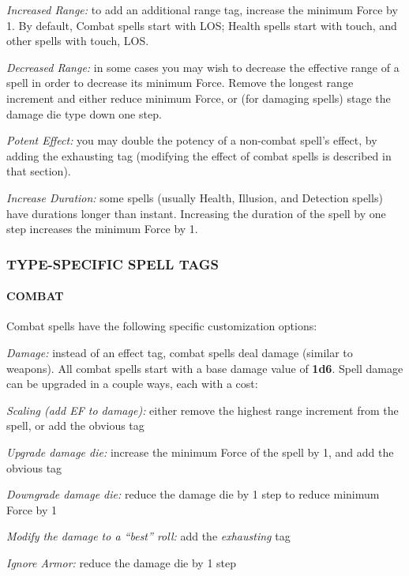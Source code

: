 \documentclass[oneside,10pt]{article}
\begin{document}
\begin{multicols}{2}
\begin{adjustwidth*}{.5cm}{.5cm}
\textit{Increased Range:} to add an additional range tag, increase
the minimum Force by 1. By default, Combat spells start with
LOS; Health spells start
with touch, and other spells with touch, LOS.

\textit{Decreased Range:} in some cases you may wish to decrease
the effective range of a spell in order to decrease its minimum Force. Remove the longest range increment and either reduce minimum Force, or (for damaging spells) stage
the damage die type down one step.

\textit{Potent Effect:} you may double the potency of a non-combat spell’s effect, by adding the exhausting tag (modifying
the effect of combat spells is described in that section).

\textit{Increase Duration:} some spells (usually Health, Illusion,
and Detection spells) have durations longer than instant.
Increasing the duration of the spell by one step increases the minimum Force by 1.
\end{adjustwidth*}

\subsubsection{TYPE-SPECIFIC SPELL TAGS}

\paragraph{COMBAT}

Combat spells have the following specific customization options:
\begin{adjustwidth*}{.5cm}{.5cm}

\textit{Damage:} instead of an effect tag, combat spells deal damage (similar to weapons). All combat spells start with a
base damage value of \textbf{1d6}. Spell damage can be upgraded
in a couple ways, each with a cost:

\textit{Scaling (add EF to damage):} either remove the highest range increment
from the spell, or add the obvious tag

\textit{Upgrade damage die:} increase the minimum Force
of the spell by 1, and add the obvious tag

\textit{Downgrade damage die:} reduce the damage die by 1 step to reduce minimum Force by 1 

\textit{Modify the damage to a “best” roll:} add the \textit{exhausting} tag

\textit{Ignore Armor:} reduce the damage die by 1 step


\end{adjustwidth*}
\end{multicols}
\end{document}
